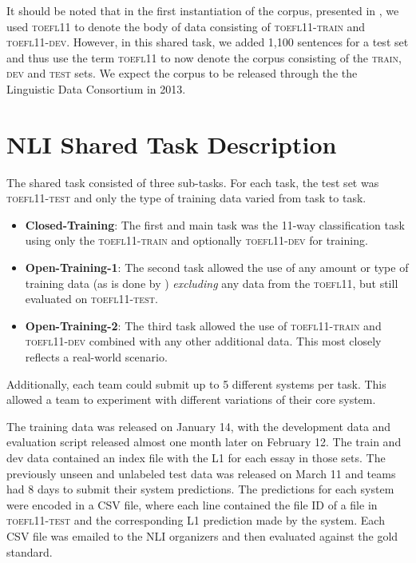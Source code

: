 \documentclass[11pt,letterpaper]{article}
\begin{document}
It should be noted that in the first instantiation of the corpus,
presented in , we used \textsc{toefl11}
to denote the body of data consisting of \textsc{toefl11-train} and \textsc{toefl11-dev}.
However, in this shared task, we added 1,100 sentences for a test
set and thus use the term \textsc{toefl11} to now denote the corpus
consisting of the \textsc{train}, \textsc{dev} and \textsc{test} sets.  We expect the corpus
to be released through the the Linguistic Data Consortium in 2013.


\section{NLI Shared Task Description}
\label{sec-shared-task-description}
The shared task consisted of three sub-tasks. For each task, the
test set was \textsc{toefl11-test} and only the type of training data varied from
task to task.

\begin{itemize}
\item {\bf Closed-Training}:  The first and main task was the 11-way
classification task using only the \textsc{toefl11-train} and optionally \textsc{toefl11-dev} for training.
\item {\bf Open-Training-1}: The second task allowed the use of any amount or
type of training data (as is done by )
\emph{excluding} any data from the \textsc{toefl11}, but still evaluated on \textsc{toefl11-test}.
\item {\bf Open-Training-2}: The third task allowed the use of \textsc{toefl11-train} and
\textsc{toefl11-dev} combined with any other additional data. This most closely reflects
a real-world scenario.
\end{itemize}

Additionally, each team could submit up to 5 different
systems per task.  This allowed a team to experiment with different
variations of their core system.

The training data was released on January 14, with the development
data and evaluation script released almost one month later on February 12.
The train and dev data contained an index file with the L1 for each
essay in those sets.  The previously unseen and unlabeled test data was
released on March 11 and teams had 8 days to submit their system predictions.
The predictions for each system
were encoded in a CSV file, where each line contained the file ID of a
file in \textsc{toefl11-test} and the corresponding L1 prediction made by the
system.  Each CSV file was emailed to the NLI organizers and then
evaluated against the gold standard.
\end{document}
